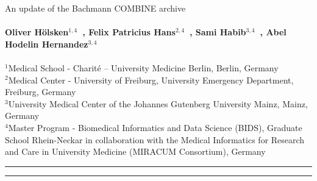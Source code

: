 \begin{titlepage}
{\noindent\huge{An update of the Bachmann COMBINE archive}}
\\ \\
\noindent\textbf{Oliver H\"olsken$^{1,4}$~, Felix Patricius Hans$^{2,4}$~, Sami Habib$^{3,4}$~, Abel Hodelin Hernandez$^{3,4}$~}
\\ \\
	\small $^{1}$Medical School - Charité – University Medicine Berlin, Berlin, Germany \\
	\small $^{2}$Medical Center - University of Freiburg, University Emergency Department, Freiburg, Germany \\
	\small $^{3}$University Medical Center of the Johannes Gutenberg University Mainz, Mainz, Germany \\
	\small $^{4}$Master Program - Biomedical Informatics and Data Science (BIDS), Graduate School Rhein-Neckar in collaboration with the Medical Informatics for Research and Care in University Medicine (MIRACUM Consortium), Germany \\

\hrule

 \hspace{10pt}

\noindent{}

\hrule
\end{titlepage}

